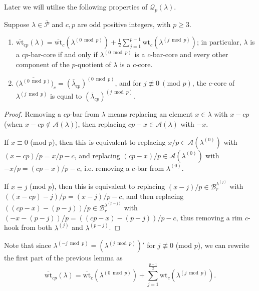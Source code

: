 \documentclass[ALCO, Unicode,published]{cedram}
\newcommand*\nicefrac[2]{#1/#2}
\begin{document}
Later we will utilise the following properties of $\mathcal{Q}_p(\lambda)$. 
\begin{lemm}\label{lem3}
Suppose $\lambda\in\overline{\mathcal{P}}$ and $c,p$ are odd positive integers, with $p\geq 3$. 
\begin{enumerate}
\item $\overline{\text{wt}}_{cp}(\lambda)=\overline{\text{wt}}_{c}(\lambda^{(0\bmod p)})+\tfrac{1}{2}\sum_{j=1}^{p-1}\text{wt}_c(\lambda^{(j\bmod p)})$; in particular, $\lambda$ is a $cp$-bar-core if and only if $\lambda^{(0\bmod p)}$ is a $c$-bar-core and every other component of the $p$-quotient of $\lambda$ is a $c$-core. 
\item ${\overline{(\lambda^{(0\bmod p)}})}_c=(\overline{\lambda}_{cp})^{(0\bmod p)}$, and for $j\not\equiv0\:(\text{mod }p)$, the $c$-core of $\lambda^{(j\bmod p)}$ is equal to $(\overline{\lambda}_{cp})^{(j\bmod p)}$.
\end{enumerate}
\end{lemm}
\begin{proof}
Removing a $cp$-bar from $\lambda$ means replacing an element $x\in\lambda$ with $x-cp$ (when $x-cp\not\in\mathcal{A}(\lambda)$), then replacing $cp-x\in\mathcal{A}(\lambda)$ with $-x$. 

If $x\equiv0$ (mod $p$), then this is equivalent to replacing $\nicefrac{x}{p}\in\mathcal{A}(\lambda^{(0)})$ with $\nicefrac{(x-cp)}{p}=\nicefrac{x}{p}-c$, and replacing $\nicefrac{(cp-x)}{p}\in\mathcal{A}(\lambda^{(0)})$ with $\nicefrac{-x}{p}=\nicefrac{(cp-x)}{p}-c$, i.e. removing a $c$-bar from $\lambda^{(0)}$. 

If $x\equiv j$ (mod $p$), then this is equivalent to replacing $\nicefrac{(x-j)}{p}\in\mathcal{B}^{\lambda^{(j)}}_r$ with $\nicefrac{((x-cp)-j)}{p}=\nicefrac{(x-j)}{p}-c$, and then replacing $\nicefrac{((cp-x)-(p-j))}{p}\in\mathcal{B}^{\lambda^{(p-j)}}_r$ with $\nicefrac{(-x-(p-j))}{p}=\nicefrac{((cp-x)-(p-j))}{p}-c$, thus removing a rim $c$-hook from both $\lambda^{(j)}$ and $\lambda^{(p-j)}$.
\end{proof}

\begin{rema*}
Note that since $\lambda^{(-j\bmod p)}=(\lambda^{(j\bmod p)})'$ for $j\not\equiv0$ (mod $p$), we can rewrite the first part of the previous lemma as 
$$\overline{\text{wt}}_{cp}(\lambda)=\overline{\text{wt}}_{c}(\lambda^{(0\bmod p)})+\sum_{j=1}^{\tfrac{p-1}{2}}\text{wt}_c(\lambda^{(j\bmod p)}).$$ 
\end{rema*}
\end{document}
